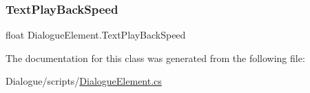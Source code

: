 \mbox{\label{class_dialogue_element_a14e05abcef33f93b97d5b3ae2c11dd1d}} 
\subsubsection{\texorpdfstring{Text\+Play\+Back\+Speed}{TextPlayBackSpeed}}
{\footnotesize\ttfamily float Dialogue\+Element.\+Text\+Play\+Back\+Speed}



The documentation for this class was generated from the following file\+:\begin{DoxyCompactItemize}
\item 
Dialogue/scripts/\mbox{\hyperlink{_dialogue_element_8cs}{Dialogue\+Element.\+cs}}\end{DoxyCompactItemize}
